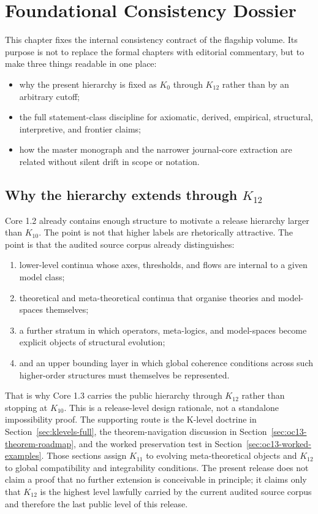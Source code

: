 \section{Foundational Consistency Dossier}
\label{sec:oc13-foundational-consistency}

This chapter fixes the internal consistency contract of the flagship volume.
Its purpose is not to replace the formal chapters with editorial commentary,
but to make three things readable in one place:

\begin{itemize}
\item why the present hierarchy is fixed as \(K_0\) through \(K_{12}\) rather
      than by an arbitrary cutoff;
\item the full statement-class discipline for axiomatic, derived, empirical,
      structural, interpretive, and frontier claims;
\item how the master monograph and the narrower journal-core extraction are
      related without silent drift in scope or notation.
\end{itemize}

\subsection{Why the hierarchy extends through \texorpdfstring{$K_{12}$}{K12}}

Core 1.2 already contains enough structure to motivate a release hierarchy
larger than \(K_{10}\). The point is not that higher labels are rhetorically
attractive. The point is that the audited source corpus already distinguishes:

\begin{enumerate}
\item lower-level continua whose axes, thresholds, and flows are internal to a
      given model class;
\item theoretical and meta-theoretical continua that organise theories and
      model-spaces themselves;
\item a further stratum in which operators, meta-logics, and model-spaces
      become explicit objects of structural evolution;
\item and an upper bounding layer in which global coherence conditions across
      such higher-order structures must themselves be represented.
\end{enumerate}

That is why Core 1.3 carries the public hierarchy through \(K_{12}\) rather
than stopping at \(K_{10}\). This is a release-level design rationale, not a
standalone impossibility proof. The supporting route is the K-level doctrine in
Section~\ref{sec:klevels-full}, the theorem-navigation discussion in
Section~\ref{sec:oc13-theorem-roadmap}, and the worked preservation test in
Section~\ref{sec:oc13-worked-examples}. Those sections assign \(K_{11}\) to
evolving meta-theoretical objects and \(K_{12}\) to global compatibility and
integrability conditions. The present release does not claim a proof that no
further extension is conceivable in principle; it claims only that \(K_{12}\)
is the highest level lawfully carried by the current audited source corpus and
therefore the last public level of this release.

